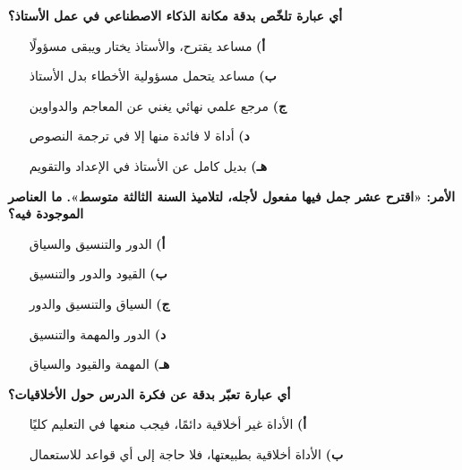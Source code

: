 \documentclass[11pt,a4paper]{article}
\begin{document}
\begin{multicols}{2}
\noindent\begin{minipage}{\linewidth}
\hangindent=0.7cm\textbf{أي عبارة تلخّص بدقة مكانة الذكاء الاصطناعي في عمل الأستاذ؟}
\begin{itemize}[leftmargin=0.95cm, labelsep=4pt, itemsep=0pt, topsep=2pt, parsep=0pt]
  \item[\textbf{أ)}] مساعد يقترح، والأستاذ يختار ويبقى مسؤولًا
  \item[\textbf{ب)}] مساعد يتحمل مسؤولية الأخطاء بدل الأستاذ
  \item[\textbf{ج)}] مرجع علمي نهائي يغني عن المعاجم والدواوين
  \item[\textbf{د)}] أداة لا فائدة منها إلا في ترجمة النصوص
  \item[\textbf{هـ)}] بديل كامل عن الأستاذ في الإعداد والتقويم
\end{itemize}
\end{minipage}\par\vspace{7pt plus 4pt}
\noindent\begin{minipage}{\linewidth}
\hangindent=0.7cm\textbf{الأمر: «اقترح عشر جمل فيها مفعول لأجله، لتلاميذ السنة الثالثة متوسط». ما العناصر الموجودة فيه؟}
\begin{itemize}[leftmargin=0.95cm, labelsep=4pt, itemsep=0pt, topsep=2pt, parsep=0pt]
  \item[\textbf{أ)}] الدور والتنسيق والسياق
  \item[\textbf{ب)}] القيود والدور والتنسيق
  \item[\textbf{ج)}] السياق والتنسيق والدور
  \item[\textbf{د)}] الدور والمهمة والتنسيق
  \item[\textbf{هـ)}] المهمة والقيود والسياق
\end{itemize}
\end{minipage}\par\vspace{7pt plus 4pt}
\noindent\begin{minipage}{\linewidth}
\hangindent=0.7cm\textbf{أي عبارة تعبّر بدقة عن فكرة الدرس حول الأخلاقيات؟}
\begin{itemize}[leftmargin=0.95cm, labelsep=4pt, itemsep=0pt, topsep=2pt, parsep=0pt]
  \item[\textbf{أ)}] الأداة غير أخلاقية دائمًا، فيجب منعها في التعليم كليًا
  \item[\textbf{ب)}] الأداة أخلاقية بطبيعتها، فلا حاجة إلى أي قواعد للاستعمال

\end{itemize}
\end{minipage}
\end{multicols}
\end{document}
